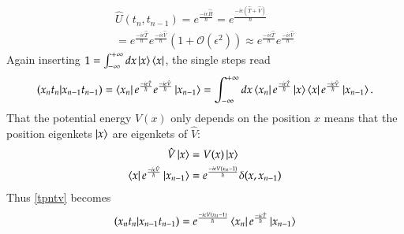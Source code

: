 \begin{align}\label{UTV}
  \hat{U}(t_{n},t_{n-1}) = e^{\frac{-i \epsilon \hat{H}}{\hbar}} = e^{\frac{-i \epsilon (\hat T + \hat V)}{\hbar}} \\
  = e^{\frac{-i \epsilon \hat{T}}{\hbar}} e^{\frac{-i \epsilon \hat{V}}{\hbar}} (1 + \mathcal{O} (\epsilon^2) ) \approx e^{\frac{-i \epsilon \hat{T}}{\hbar}} e^{\frac{-i \epsilon \hat{V}}{\hbar}} 
\end{align}
Again inserting $1 = \int_{-\infty}^{+\infty} dx \ket{x}\bra{x}$, the single steps read
\begin{equation}\label{tpntv}
  (x_n t_n | x_{n-1} t_{n-1}) = \bra{x_n} e^{\frac{-i \epsilon \hat{T}}{\hbar}} e^{\frac{-i \epsilon \hat{V}}{\hbar}}  \ket{x_{n-1}} = \int_{-\infty}^{+\infty} dx \bra{x_n} e^{\frac{-i \epsilon \hat{T}}{\hbar}} \ket{x} \bra{x} e^{\frac{-i \epsilon \hat{V}}{\hbar}}  \ket{x_{n-1}}.
\end{equation}
That the potential energy $V(x)$ only depends on the position $x$ means that the position eigenkets $\ket{x}$ are eigenkets of $\hat{V}$:
\begin{align}\label{Vx}
  \hat{V} \ket{x} &= V(x) \ket{x}  \\
  \bra{x} e^{\frac{-i \epsilon \hat{V}}{\hbar}}  \ket{x_{n-1}} &= e^{\frac{-i \epsilon V(x_n-1)}{\hbar}} \delta (x,x_{n-1})
\end{align}
Thus \ref{tpntv} becomes
\begin{equation}\label{tpni}
   (x_n t_n | x_{n-1} t_{n-1}) = e^{\frac{-i \epsilon V(x_n-1)}{\hbar}} \bra{x_n} e^{\frac{-i \epsilon \hat{T}}{\hbar}} \ket{x_{n-1}}
\end{equation}



